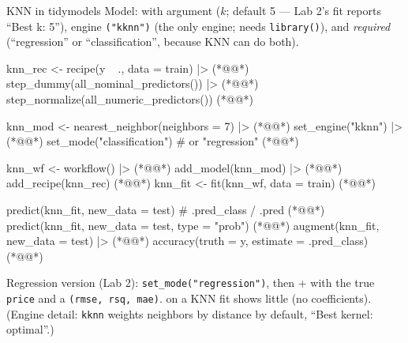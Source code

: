 \begin{topic}{KNN in tidymodels }
Model:  with argument  ($k$; default 5 --- Lab 2's fit reports ``Best k: 5''), engine \texttt{("kknn")} (the only engine; needs \texttt{library(}\texttt{)}), and  \emph{required} (``regression'' or ``classification'', because KNN can do both).
\begin{rcode}
knn_rec <- recipe(y ~ ., data = train) |>   (*@@*)
  step_dummy(all_nominal_predictors()) |>   (*@@*)
  step_normalize(all_numeric_predictors())  (*@@*)

knn_mod <- nearest_neighbor(neighbors = 7) |> (*@@*)
  set_engine("kknn") |>                     (*@@*)
  set_mode("classification")    # or "regression"  (*@@*)

knn_wf <- workflow() |>                     (*@@*)
  add_model(knn_mod) |>                     (*@@*)
  add_recipe(knn_rec)                       (*@@*)
knn_fit <- fit(knn_wf, data = train)        (*@@*)

predict(knn_fit, new_data = test)        # .pred_class / .pred  (*@@*)
predict(knn_fit, new_data = test, type = "prob")  (*@@*)
augment(knn_fit, new_data = test) |>        (*@@*)
  accuracy(truth = y, estimate = .pred_class) (*@@*)
\end{rcode}
Regression version (Lab 2): \texttt{set\_mode("regression")}, then  +  with the true \texttt{price} and a \texttt{(rmse, rsq, mae)}.  on a KNN fit shows little (no coefficients). (Engine detail: \texttt{kknn} weights neighbors by distance by default, ``Best kernel: optimal''.)
\end{topic}

